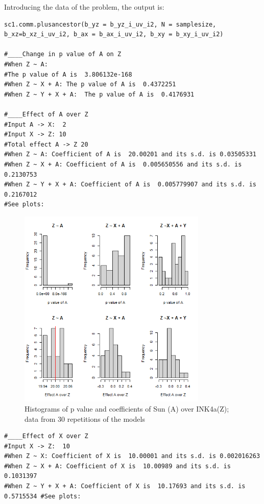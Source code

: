 \documentclass{article}
\begin{document}
Introducing the data of the problem, the output is:\par

\begin{lstlisting}
sc1.comm.plusancestor(b_yz = b_yz_i_uv_i2, N = samplesize, b_xz=b_xz_i_uv_i2, b_ax = b_ax_i_uv_i2, b_xy = b_xy_i_uv_i2)

#____Change in p value of A on Z
#When Z ~ A: 
#The p value of A is  3.806132e-168 
#When Z ~ X + A: The p value of A is  0.4372251 
#When Z ~ Y + X + A:  The p value of A is  0.4176931 

#____Effect of A over Z
#Input A -> X:  2 
#Input X -> Z: 10 
#Total effect A -> Z 20 
#When Z ~ A: Coefficient of A is  20.00201 and its s.d. is 0.03505331 
#When Z ~ X + A: Coefficient of A is  0.005650556 and its s.d. is 0.2130753 
#When Z ~ Y + X + A: Coefficient of A is  0.005779907 and its s.d. is 0.2167012 
#See plots:
\end{lstlisting}

\begin{figure}[h]
\caption{Histograms of p value and coefficients of Sun (A) over INK4a(Z); data from 30 repetitions of the models}
\includegraphics[width=9cm]{histA.sun.png}
\centering
\end{figure}

\begin{lstlisting}
#____Effect of X over Z
#Input X -> Z:  10 
#When Z ~ X: Coefficient of X is  10.00001 and its s.d. is 0.002016263 
#When Z ~ X + A: Coefficient of X is  10.00989 and its s.d. is 0.1031397 
#When Z ~ Y + X + A: Coefficient of X is  10.17693 and its s.d. is 0.5715534 #See plots:
\end{lstlisting}
\end{document}
